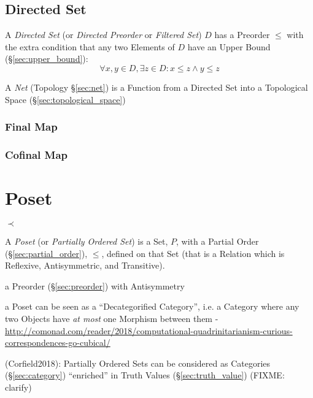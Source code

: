 \subsection{Directed Set}\label{sec:directed_set}

A \emph{Directed Set} (or \emph{Directed Preorder} or \emph{Filtered
  Set}) $D$ has a Preorder $\leq$ with the extra condition that any
two Elements of $D$ have an Upper Bound (\S\ref{sec:upper_bound}):
\[
  \forall x, y \in D, \exists z \in D : x \leq z \wedge y \leq z
\]

\fist A \emph{Net} (Topology \S\ref{sec:net}) is a Function from a Directed Set
into a Topological Space (\S\ref{sec:topological_space})



\subsubsection{Final Map}\label{sec:final_map}

\subsubsection{Cofinal Map}\label{sec:cofinal_map}



\section{Poset}\label{sec:poset}

$\prec$

A \emph{Poset} (or \emph{Partially Ordered Set}) is a Set, $P$, with a
Partial Order (\S\ref{sec:partial_order}), $\leq$, defined on that
Set (that is a Relation which is Reflexive, Antisymmetric, and
Transitive).

a Preorder (\S\ref{sec:preorder}) with Antisymmetry

a Poset can be seen as a ``Decategorified Category'', i.e. a Category where any
two Objects have \emph{at most} one Morphism between them -
\url{http://comonad.com/reader/2018/computational-quadrinitarianism-curious-correspondences-go-cubical/}

(Corfield2018): Partially Ordered Sets can be considered as Categories
(\S\ref{sec:category}) ``enriched'' in Truth Values (\S\ref{sec:truth_value})
(FIXME: clarify)

